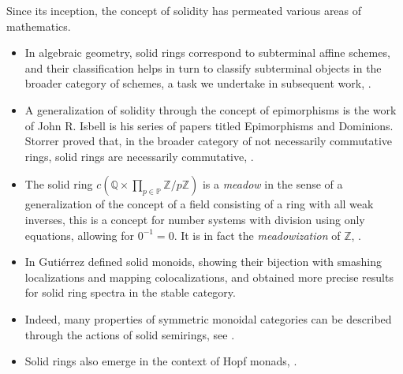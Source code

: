 \documentclass{amsart}
\newcommand{\Z}{{\mathbb Z}}
\renewcommand{\P}{{\mathbb P}}
\newcommand{\Q}{{\mathbb Q}}
\begin{document}
    Since its inception, the concept of solidity has permeated various areas of mathematics.
    \begin{itemize}
        \item In algebraic geometry, solid rings correspond to subterminal affine schemes, and their classification helps in turn to classify subterminal objects in the broader category of schemes, a task we undertake in subsequent work, \cite{BG25S}.

        \item A generalization of solidity through the concept of epimorphisms is the work of John R. Isbell is his series of papers titled Epimorphisms and Dominions.
        Storrer proved that, in the broader category of not necessarily commutative rings, solid rings are necessarily commutative, \cite[Proposition 1.3]{Sto73}. 
        
        \item The solid ring $c(\Q \times \prod\limits_{p \in \P} \Z/p\Z)$ is a \emph{meadow} in the sense of \cite{BHT09} a generalization of the concept of a field consisting of a ring with all weak inverses, this is a concept for number systems with division using only equations, allowing for $0^{-1} = 0$.
        It is in fact the \emph{meadowization} of $\Z$, \cite{5046853}.  

        \item In \cite{Gut15} Gutiérrez defined solid monoids, showing their bijection with smashing localizations and mapping colocalizations, and obtained more precise results for solid ring spectra in the stable category.

        \item 
        Indeed, many properties of symmetric monoidal categories can be described through the actions of solid semirings, see \cite{Ber18}.

        \item
        Solid rings also emerge in the context of Hopf monads, \cite{HL23}.\\
    \end{itemize}
\end{document}
